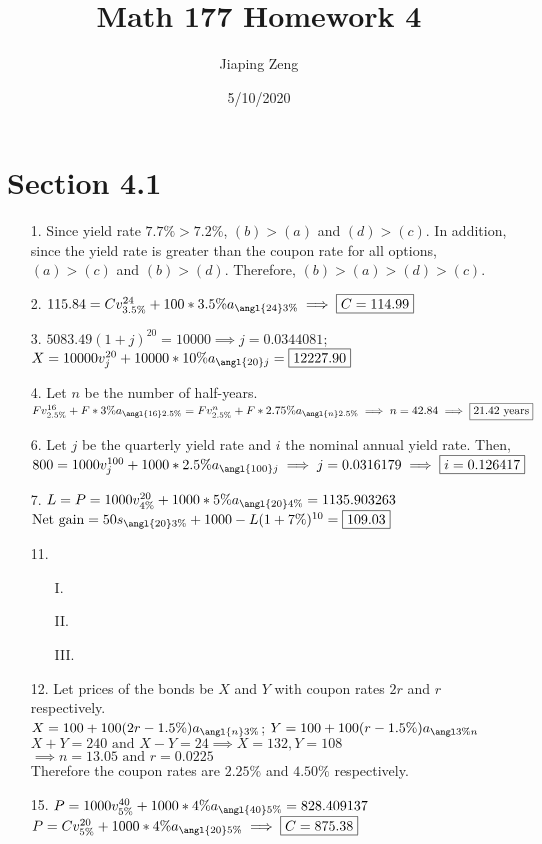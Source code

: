 \documentclass{article}
\title{Math 177 Homework 4}
\date{5/10/2020}
\author{Jiaping Zeng}
\begin{document}
\maketitle

\section*{Section 4.1}
\begin{itemize}
	\item [1.] Since yield rate $7.7\%>7.2\%$, $(b)>(a)$ and $(d)>(c)$. In addition, since the yield rate is greater than the coupon rate for all options, $(a)>(c)$ and $(b)>(d)$. Therefore, $(b)>(a)>(d)>(c)$.
	\item [2.] $115.84=Cv_{3.5\%}^{24}+100*3.5\%a_{\angl{24}3\%} \implies \boxed{C=114.99}$
	\item [3.] $5083.49(1+j)^{20}=10000 \implies j=0.0344081$; $X=10000v_j^{20}+10000*10\%a_{\angl{20}j}=\boxed{12227.90}$
	\item [4.] Let $n$ be the number of half-years. $Fv_{2.5\%}^{16}+F*3\%a_{\angl{16}2.5\%}=Fv_{2.5\%}^n+F*2.75\%a_{\angl{n}2.5\%} \implies n=42.84 \implies \boxed{21.42\text{ years}}$
	\item [6.] Let $j$ be the quarterly yield rate and $i$ the nominal annual yield rate. Then, $800=1000v_j^{100}+1000*2.5\%a_{\angl{100}j} \implies j=0.0316179 \implies \boxed{i=0.126417}$
	\item [7.] $L=P=1000v_{4\%}^{20}+1000*5\%a_{\angl{20}4\%}=1135.903263$\\$\text{Net gain}=50s_{\angl{20}3\%}+1000-L(1+7\%)^{10}=\boxed{109.03}$
	\item [11.] 
	\begin{itemize}
		\item [I.]
		\item [II.]
		\item [III.]
	\end{itemize}
	\item [12.] Let prices of the bonds be $X$ and $Y$ with coupon rates $2r$ and $r$ respectively.\\$X=100+100(2r-1.5\%)a_{\angl{n}3\%}$; $Y=100+100(r-1.5\%)a_{\angl{3\%}n}$\\$X+Y=240 \text{ and } X-Y=24 \implies X=132, Y=108$\\$\implies n=13.05 \text{ and } r=0.0225$\\Therefore the coupon rates are $2.25\%$ and $4.50\%$ respectively.
	\item [15.] $P=1000v_{5\%}^{40}+1000*4\%a_{\angl{40}5\%}=828.409137$\\$P=Cv_{5\%}^{20}+1000*4\%a_{\angl{20}5\%} \implies \boxed{C=875.38}$

\end{itemize}
\end{document}
